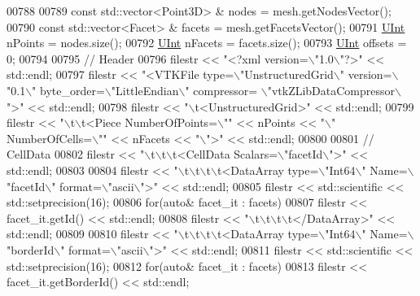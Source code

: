 \begin{DoxyCode}
00788 
00789     \textcolor{keyword}{const} std::vector<Point3D> & nodes = mesh.getNodesVector();
00790     \textcolor{keyword}{const} std::vector<Facet> & facets = mesh.getFacetsVector();
00791     \hyperlink{namespaceFVCode3D_a4bf7e328c75d0fd504050d040ebe9eda}{UInt} nPoints = nodes.size();
00792     \hyperlink{namespaceFVCode3D_a4bf7e328c75d0fd504050d040ebe9eda}{UInt} nFacets = facets.size();
00793     \hyperlink{namespaceFVCode3D_a4bf7e328c75d0fd504050d040ebe9eda}{UInt} offsets = 0;
00794 
00795     \textcolor{comment}{// Header}
00796     filestr << \textcolor{stringliteral}{"<?xml version=\(\backslash\)"1.0\(\backslash\)"?>"} << std::endl;
00797     filestr << \textcolor{stringliteral}{"<VTKFile type=\(\backslash\)"UnstructuredGrid\(\backslash\)" version=\(\backslash\)"0.1\(\backslash\)" byte\_order=\(\backslash\)"LittleEndian\(\backslash\)" compressor=
      \(\backslash\)"vtkZLibDataCompressor\(\backslash\)">"} << std::endl;
00798     filestr << \textcolor{stringliteral}{"\(\backslash\)t<UnstructuredGrid>"} << std::endl;
00799     filestr << \textcolor{stringliteral}{"\(\backslash\)t\(\backslash\)t<Piece NumberOfPoints=\(\backslash\)""} << nPoints << \textcolor{stringliteral}{"\(\backslash\)" NumberOfCells=\(\backslash\)""} << nFacets << \textcolor{stringliteral}{"\(\backslash\)">"} << 
      std::endl;
00800 
00801     \textcolor{comment}{// CellData}
00802     filestr << \textcolor{stringliteral}{"\(\backslash\)t\(\backslash\)t\(\backslash\)t<CellData Scalars=\(\backslash\)"facetId\(\backslash\)">"} << std::endl;
00803 
00804     filestr << \textcolor{stringliteral}{"\(\backslash\)t\(\backslash\)t\(\backslash\)t\(\backslash\)t<DataArray type=\(\backslash\)"Int64\(\backslash\)" Name=\(\backslash\)"facetId\(\backslash\)" format=\(\backslash\)"ascii\(\backslash\)">"} << std::endl;
00805     filestr << std::scientific << std::setprecision(16);
00806     \textcolor{keywordflow}{for}(\textcolor{keyword}{auto}& facet\_it : facets)
00807         filestr << facet\_it.getId() << std::endl;
00808     filestr << \textcolor{stringliteral}{"\(\backslash\)t\(\backslash\)t\(\backslash\)t\(\backslash\)t</DataArray>"} << std::endl;
00809 
00810     filestr << \textcolor{stringliteral}{"\(\backslash\)t\(\backslash\)t\(\backslash\)t\(\backslash\)t<DataArray type=\(\backslash\)"Int64\(\backslash\)" Name=\(\backslash\)"borderId\(\backslash\)" format=\(\backslash\)"ascii\(\backslash\)">"} << std::endl;
00811     filestr << std::scientific << std::setprecision(16);
00812     \textcolor{keywordflow}{for}(\textcolor{keyword}{auto}& facet\_it : facets)
00813         filestr << facet\_it.getBorderId() << std::endl;

\end{DoxyCode}
